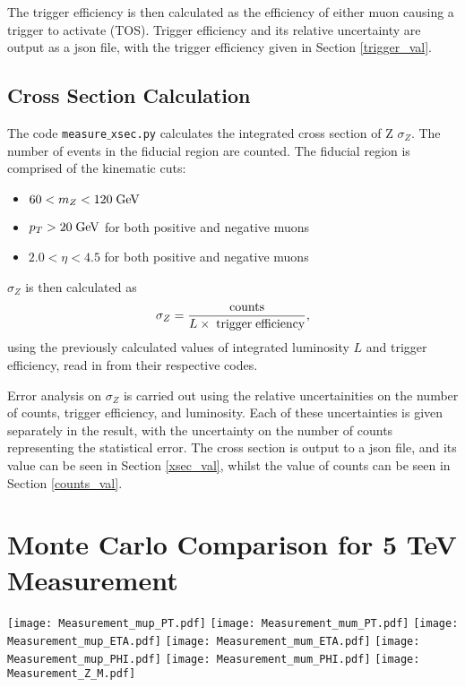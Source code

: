 \documentclass[a4paper]{article}
\begin{document}
The trigger efficiency is then calculated as the efficiency of either muon causing a trigger to activate (TOS).
Trigger efficiency and its relative uncertainty are output as a json file, with the trigger efficiency given in Section \ref{trigger_val}.

\subsection{Cross Section Calculation}
The code \texttt{measure$\_$xsec.py} calculates the integrated cross section of Z $\sigma_Z$.
The number of events in the fiducial region are counted. The fiducial region is comprised of the kinematic cuts:

\begin{itemize}
  \item $60 < m_Z < 120 \; {\rm GeV}$ 
  \item $p_T > 20 \; {\rm GeV}$ for both positive and negative muons
  \item $2.0 < \eta < 4.5$ for both positive and negative muons
\end{itemize}

$\sigma_Z$ is then calculated as
\begin{equation}
\sigma_Z = \frac{{\rm counts}}{L \times {\rm \; trigger \; efficiency}},
\end{equation}
using the previously calculated values of integrated luminosity $L$ and trigger efficiency, read in from their respective codes.

Error analysis on $\sigma_Z$ is carried out using the relative uncertainities on the number of counts, trigger efficiency, and luminosity. Each of these uncertainties is given separately in the result, with the uncertainty on the number of counts representing the statistical error. The cross section is output to a json file, and its value can be seen in Section \ref{xsec_val}, whilst the value of counts can be seen in Section \ref{counts_val}.

\section{Monte Carlo Comparison for 5 TeV Measurement} \label{histograms}

\texttt{[image: Measurement\_mup\_PT.pdf]}
\texttt{[image: Measurement\_mum\_PT.pdf]}
\texttt{[image: Measurement\_mup\_ETA.pdf]}
\texttt{[image: Measurement\_mum\_ETA.pdf]}
\texttt{[image: Measurement\_mup\_PHI.pdf]}
\texttt{[image: Measurement\_mum\_PHI.pdf]}
\texttt{[image: Measurement\_Z\_M.pdf]}




{}

\end{document}
